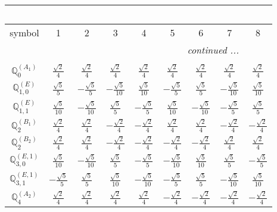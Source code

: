 \documentclass[fleqn,10pt,landscape]{article}
\begin{document}
\begin{itemize}
{\begin{center}
\begin{longtable}{ccccccccc}
\multicolumn{8}{l}{\tablename\ \thetable{}} \\
 \hline \hline
symbol & 1 & 2 & 3 & 4 & 5 & 6 & 7 & 8 \\ \hline \endhead

 \hline \hline
\multicolumn{8}{r}{\footnotesize\it continued ...} \\ \endfoot

 \hline \hline
\multicolumn{8}{r}{} \\ \endlastfoot

$\mathbb{Q}_{0}^{(A_{1})}$ & $ \frac{\sqrt{2}}{4} $ & $ \frac{\sqrt{2}}{4} $ & $ \frac{\sqrt{2}}{4} $ & $ \frac{\sqrt{2}}{4} $ & $ \frac{\sqrt{2}}{4} $ & $ \frac{\sqrt{2}}{4} $ & $ \frac{\sqrt{2}}{4} $ & $ \frac{\sqrt{2}}{4} $ \\ \hline
$\mathbb{Q}_{1,0}^{(E)}$ & $ \frac{\sqrt{5}}{5} $ & $ - \frac{\sqrt{5}}{5} $ & $ - \frac{\sqrt{5}}{10} $ & $ \frac{\sqrt{5}}{10} $ & $ - \frac{\sqrt{5}}{5} $ & $ \frac{\sqrt{5}}{5} $ & $ - \frac{\sqrt{5}}{10} $ & $ \frac{\sqrt{5}}{10} $ \\ \hline
$\mathbb{Q}_{1,1}^{(E)}$ & $ \frac{\sqrt{5}}{10} $ & $ - \frac{\sqrt{5}}{10} $ & $ \frac{\sqrt{5}}{5} $ & $ - \frac{\sqrt{5}}{5} $ & $ \frac{\sqrt{5}}{10} $ & $ - \frac{\sqrt{5}}{10} $ & $ - \frac{\sqrt{5}}{5} $ & $ \frac{\sqrt{5}}{5} $ \\ \hline
$\mathbb{Q}_{2}^{(B_{1})}$ & $ \frac{\sqrt{2}}{4} $ & $ \frac{\sqrt{2}}{4} $ & $ - \frac{\sqrt{2}}{4} $ & $ - \frac{\sqrt{2}}{4} $ & $ \frac{\sqrt{2}}{4} $ & $ \frac{\sqrt{2}}{4} $ & $ - \frac{\sqrt{2}}{4} $ & $ - \frac{\sqrt{2}}{4} $ \\ \hline
$\mathbb{Q}_{2}^{(B_{2})}$ & $ \frac{\sqrt{2}}{4} $ & $ \frac{\sqrt{2}}{4} $ & $ - \frac{\sqrt{2}}{4} $ & $ - \frac{\sqrt{2}}{4} $ & $ - \frac{\sqrt{2}}{4} $ & $ - \frac{\sqrt{2}}{4} $ & $ \frac{\sqrt{2}}{4} $ & $ \frac{\sqrt{2}}{4} $ \\ \hline
$\mathbb{Q}_{3,0}^{(E,1)}$ & $ \frac{\sqrt{5}}{10} $ & $ - \frac{\sqrt{5}}{10} $ & $ \frac{\sqrt{5}}{5} $ & $ - \frac{\sqrt{5}}{5} $ & $ - \frac{\sqrt{5}}{10} $ & $ \frac{\sqrt{5}}{10} $ & $ \frac{\sqrt{5}}{5} $ & $ - \frac{\sqrt{5}}{5} $ \\ \hline
$\mathbb{Q}_{3,1}^{(E,1)}$ & $ - \frac{\sqrt{5}}{5} $ & $ \frac{\sqrt{5}}{5} $ & $ \frac{\sqrt{5}}{10} $ & $ - \frac{\sqrt{5}}{10} $ & $ - \frac{\sqrt{5}}{5} $ & $ \frac{\sqrt{5}}{5} $ & $ - \frac{\sqrt{5}}{10} $ & $ \frac{\sqrt{5}}{10} $ \\ \hline
$\mathbb{Q}_{4}^{(A_{2})}$ & $ \frac{\sqrt{2}}{4} $ & $ \frac{\sqrt{2}}{4} $ & $ \frac{\sqrt{2}}{4} $ & $ \frac{\sqrt{2}}{4} $ & $ - \frac{\sqrt{2}}{4} $ & $ - \frac{\sqrt{2}}{4} $ & $ - \frac{\sqrt{2}}{4} $ & $ - \frac{\sqrt{2}}{4} $ \\
\end{longtable}
\end{center}
}
\end{itemize}
\end{document}
